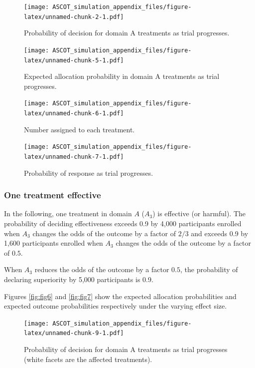 \documentclass[
]{article}
\begin{document}
\begin{figure}
\centering
\texttt{[image: ASCOT\_simulation\_appendix\_files/figure-latex/unnamed-chunk-2-1.pdf]}
\caption{\label{fig:unnamed-chunk-2}Probability of decision for domain A treatments as trial progresses.}
\end{figure}

\begin{figure}
\centering
\texttt{[image: ASCOT\_simulation\_appendix\_files/figure-latex/unnamed-chunk-5-1.pdf]}
\caption{\label{fig:unnamed-chunk-5}Expected allocation probability in domain A treatments as trial progresses.}
\end{figure}

\begin{figure}
\centering
\texttt{[image: ASCOT\_simulation\_appendix\_files/figure-latex/unnamed-chunk-6-1.pdf]}
\caption{\label{fig:unnamed-chunk-6}Number assigned to each treatment.}
\end{figure}

\begin{figure}
\centering
\texttt{[image: ASCOT\_simulation\_appendix\_files/figure-latex/unnamed-chunk-7-1.pdf]}
\caption{\label{fig:unnamed-chunk-7}Probability of response as trial progresses.}
\end{figure}

\clearpage

\hypertarget{one-treatment-effective}{%
\subsubsection{One treatment effective}\label{one-treatment-effective}}

In the following, one treatment in domain \(A\) (\(A_3\)) is effective (or harmful).
The probability of deciding effectiveness exceeds 0.9 by 4,000 participants enrolled when \(A_3\) changes the odds of the outcome by a factor of \(2/3\) and exceeds 0.9 by 1,600 participants enrolled when \(A_3\) changes the odds of the outcome by a factor of \(0.5\).

When \(A_3\) reduces the odds of the outcome by a factor \(0.5\), the probability of declaring superiority by 5,000 participants is 0.9.

Figures \ref{fig:fig6} and \ref{fig:fig7} show the expected allocation probabilities and expected outcome probabilities respectively under the varying effect size.

\begin{figure}
\centering
\texttt{[image: ASCOT\_simulation\_appendix\_files/figure-latex/unnamed-chunk-9-1.pdf]}
\caption{\label{fig:unnamed-chunk-9}Probability of decision for domain A treatments as trial progresses (white facets are the affected treatments).}
\end{figure}
\end{document}
